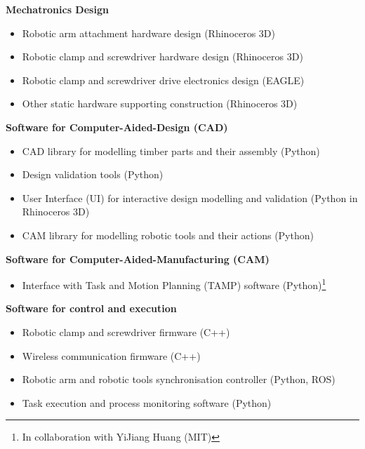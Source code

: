 \begin{description}[nosep]
	\item \textbf{Mechatronics Design}
    \begin{itemize}
    	\item Robotic arm attachment hardware design (Rhinoceros 3D) 
    	\item Robotic clamp and screwdriver hardware design (Rhinoceros 3D) 
    	\item Robotic clamp and screwdriver drive electronics design (EAGLE)
    	\item Other static hardware supporting construction (Rhinoceros 3D) 
    \end{itemize}
    
	\item \textbf{Software for Computer-Aided-Design (CAD)}
    \begin{itemize}
    	\item CAD library for modelling timber parts and their assembly (Python)
    	\item Design validation tools (Python)
    	\item User Interface (UI) for interactive design modelling and validation (Python in Rhinoceros 3D) 
    	\item CAM library for modelling robotic tools and their actions (Python)
    \end{itemize}
    
    \item \textbf{Software for Computer-Aided-Manufacturing (CAM)}
    \begin{itemize}
    	\item Interface with Task and Motion Planning (TAMP) software (Python)\footnote{In collaboration with YiJiang Huang (MIT)}
    \end{itemize}
    
    \item \textbf{Software for control and execution}
    \begin{itemize}
    	\item Robotic clamp and screwdriver firmware (C++)
    	\item Wireless communication firmware (C++)
    	\item Robotic arm and robotic tools synchronisation controller (Python, ROS)
    	\item Task execution and process monitoring software (Python)
    \end{itemize}
\end{description}

